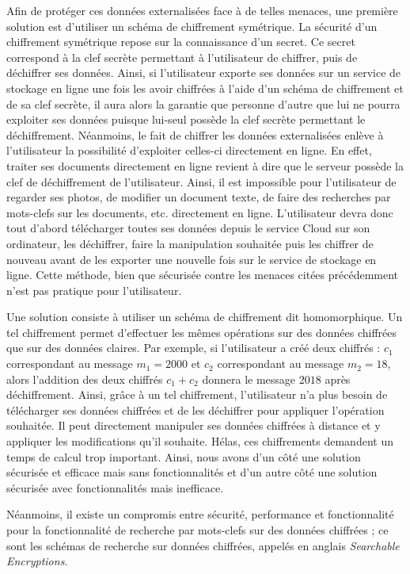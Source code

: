 \documentclass[french]{article}
\begin{document}
Afin de protéger ces données externalisées face à de telles menaces,
une première solution est d'utiliser un schéma de chiffrement
symétrique. La sécurité d'un chiffrement symétrique repose sur la
connaissance d'un secret. Ce secret correspond à la clef secrète
permettant à l'utilisateur de chiffrer, puis de déchiffrer ses
données.  Ainsi, si l'utilisateur exporte ses données sur un service
de stockage en ligne une fois les avoir chiffrées à l'aide d'un schéma
de chiffrement et de sa clef secrète, il aura alors la garantie que
personne d'autre que lui ne pourra exploiter ses données puisque
lui-seul possède la clef secrète permettant le
déchiffrement. Néanmoins, le fait de chiffrer les données
externalisées enlève à l'utilisateur la possibilité d'exploiter
celles-ci directement en ligne. En effet, traiter ses documents
directement en ligne revient à dire que le serveur possède la clef de
déchiffrement de l'utilisateur. Ainsi, il est impossible pour
l'utilisateur de regarder ses photos, de modifier un document texte,
de faire des recherches par mots-clefs sur les documents,
etc. directement en ligne. L'utilisateur devra donc tout d'abord
télécharger toutes ses données depuis le service Cloud sur son
ordinateur, les déchiffrer, faire la manipulation souhaitée puis les
chiffrer de nouveau avant de les exporter une nouvelle fois sur le
service de stockage en ligne. Cette méthode, bien que sécurisée contre
les menaces citées précédemment n'est pas pratique pour l'utilisateur.

Une solution consiste à utiliser un schéma de chiffrement dit
homomorphique. Un tel chiffrement permet d'effectuer les mêmes
opérations sur des données chiffrées que sur des données claires. Par
exemple, si l'utilisateur a créé deux chiffrés : $c_1$ correspondant
au message $m_1 = 2000$ et $c_2$ correspondant au message $m_2 = 18$,
alors l'addition des deux chiffrés $c_1 + c_2$ donnera le message
$2018$ après déchiffrement. Ainsi, grâce à un tel chiffrement,
l'utilisateur n'a plus besoin de télécharger ses données chiffrées et
de les déchiffrer pour appliquer l'opération souhaitée. Il peut
directement manipuler ses données chiffrées à distance et y appliquer
les modifications qu'il souhaite. Hélas, ces chiffrements demandent un
temps de calcul trop important. Ainsi, nous avons d'un côté une
solution sécurisée et efficace mais sans fonctionnalités et d'un autre
côté une solution sécurisée avec fonctionnalités mais inefficace.

Néanmoins, il existe un compromis entre sécurité, performance et
fonctionnalité pour la fonctionnalité de recherche par mots-clefs sur
des données chiffrées ; ce sont les schémas de recherche sur données
chiffrées, appelés en anglais \emph{Searchable Encryptions}.
\end{document}
